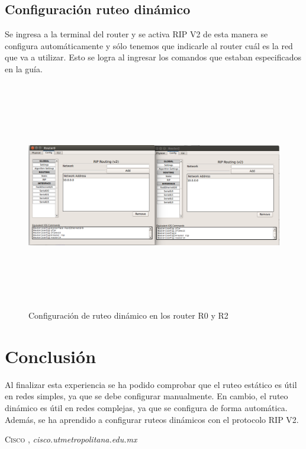 \documentclass{udpreport}
\begin{document}
	\section{Configuración ruteo dinámico}
	Se ingresa a la terminal del router y se activa RIP V2 de esta manera se configura automáticamente y sólo tenemos que
	indicarle al router cuál es la red que va a utilizar. Esto se logra al ingresar los comandos que estaban especificados en la guía.
	\begin{figure}[h]
	\centering
	\includegraphics[width=18cm, height=10cm]{rip1.png}
	\caption{Configuración de ruteo dinámico en los router R0 y R2}
	\end{figure}
	\newpage

	
\chapter{Conclusión}
 Al finalizar esta experiencia se ha podido comprobar que el ruteo estático es útil en redes simples, ya que se debe configurar manualmente. En cambio, el ruteo dinámico es útil en redes complejas, ya que se configura de forma automática. Además, se ha aprendido a configurar ruteos dinámicos con el protocolo RIP V2.\\
 
\begin{thebibliography}{x}
 \textsc{Cisco },
\textit{cisco.utmetropolitana.edu.mx}

\end{thebibliography}
\end{document}
